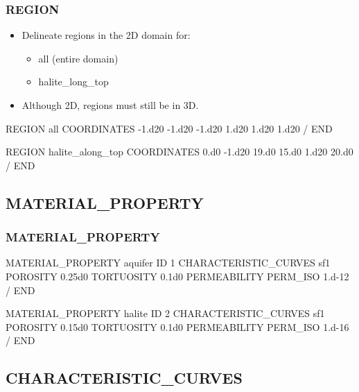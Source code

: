 \documentclass{beamer}
\newcommand\magentacomment[1]{{{\color{magenta} #1}}}
\begin{document}
\begin{frame}\frametitle{REGION}

\begin{itemize}
  \item Delineate regions in the 2D domain for:
  \begin{itemize}
    \item all (entire domain)
    \item halite\_long\_top
  \end{itemize}
  \item Although 2D, regions must still be in 3D.
\end{itemize}

\begin{semiverbatim}
REGION all
  COORDINATES
    \magentacomment{-1.d20 -1.d20 -1.d20}   
    \magentacomment{1.d20 1.d20 1.d20}      
  /
END

REGION halite\_along\_top
  COORDINATES
    0.d0 \magentacomment{-1.d20} 19.d0
    15.d0 \magentacomment{1.d20} 20.d0
  /
END
\end{semiverbatim}

\end{frame}


\subsection{MATERIAL\_PROPERTY}

\begin{frame}\frametitle{MATERIAL\_PROPERTY}

\small
\begin{semiverbatim}
MATERIAL_PROPERTY aquifer
  ID 1
  CHARACTERISTIC_CURVES sf1
  POROSITY  0.25d0
  TORTUOSITY 0.1d0
  PERMEABILITY
    PERM_ISO 1.d-12
  /
END
  
MATERIAL_PROPERTY halite
  ID 2
  CHARACTERISTIC_CURVES sf1
  POROSITY  0.15d0
  TORTUOSITY 0.1d0
  PERMEABILITY
    PERM_ISO 1.d-16
  /
END
\end{semiverbatim}

\end{frame}

\subsection{CHARACTERISTIC\_CURVES}
\end{document}
